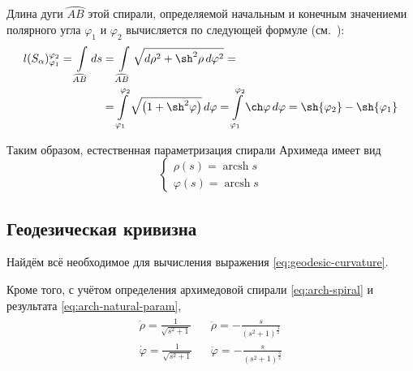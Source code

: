 \documentclass{article}
\numberwithin{equation}{section}
\renewcommand{\phi}{\varphi}
\DeclareMathOperator{\arcsh}{arcsh}
\providecommand{\arc}[1]{\wideparen{#1}}
\begin{document}
Длина дуги $\arc{AB}$ этой спирали, определяемой начальным и конечным значениеми
полярного угла $\phi_1$ и $\phi_2$ вычисляется по следующей формуле
(см. \cite{dubrovin98}):
\begin{equation}\label{eq:arch-length}
  \begin{split}
    l(S_\alpha)^{\phi_2}_{\phi_1} =
    \int \limits_{\arc{AB}}{ds} &=
    \int \limits_{\arc{AB}}{\sqrt{d\rho^2+\sh^2\rho\,d\phi^2}} =\\
    &=\int \limits^{\phi_2}_{\phi_1}{\sqrt{\left ( 1 + \sh^2\phi \right )}}\,d\phi =
    \int \limits^{\phi_2}_{\phi_1}\ch\phi\,d\phi =
    \sh{\phi_2} - \sh{\phi_1}
  \end{split}
\end{equation}

Таким образом, естественная параметризация спирали Архимеда имеет вид
\begin{equation}\label{eq:arch-natural-param}
  \begin{cases}
    \rho(s) = \arcsh{s} \\
    \phi(s) = \arcsh{s}
  \end{cases}
\end{equation}

\subsection{Геодезическая кривизна}

Найдём всё необходимое для вычисления выражения
\eqref{eq:geodesic-curvature}.

Кроме того, с учётом определения архимедовой спирали
\eqref{eq:arch-spiral} и результата \eqref{eq:arch-natural-param},
\begin{gather}
  \begin{align*}
    \dot{\rho} = \frac{1}{\sqrt{s^2+1}} && \ddot{\rho} = -\frac{s}{(s^2+1)^{\frac{3}{2}}}\\
    \dot{\phi} = \frac{1}{\sqrt{s^2+1}} && \ddot{\phi} = -\frac{s}{(s^2+1)^{\frac{3}{2}}}
  \end{align*}
\end{gather}
\end{document}

